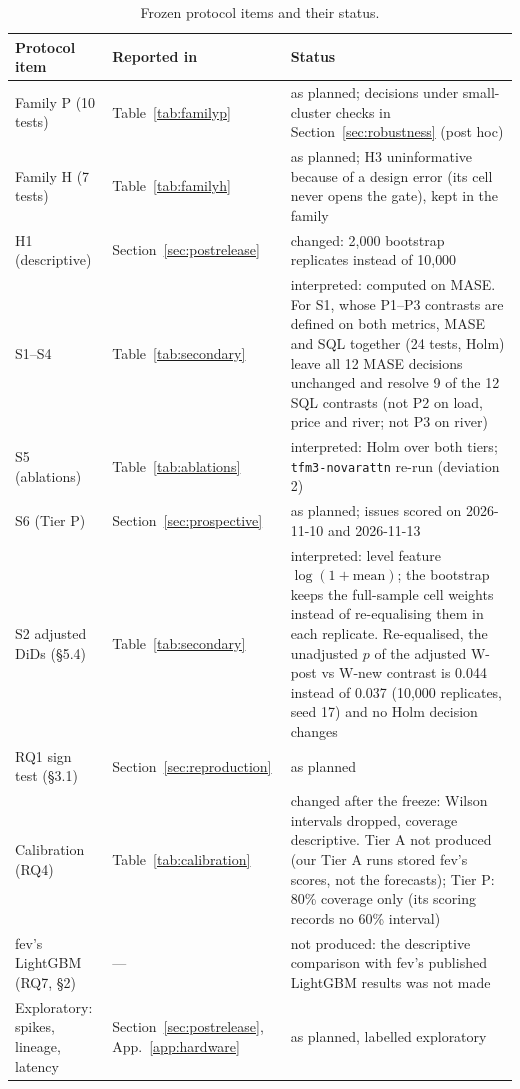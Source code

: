 \begin{table}[!htbp]
\centering
\caption{Frozen protocol items and their status.}
\label{tab:adherence}
\scriptsize
\begin{tabular}{p{4.2cm}p{2.4cm}p{8.2cm}}
\toprule
Protocol item & Reported in & Status \\
\midrule
Family P (10 tests) & Table~\ref{tab:familyp} & as planned; decisions under small-cluster checks in Section~\ref{sec:robustness} (post hoc) \\
Family H (7 tests) & Table~\ref{tab:familyh} & as planned; H3 uninformative because of a design error (its cell never opens the gate), kept in
the family \\
H1 (descriptive) & Section~\ref{sec:postrelease} & changed: 2{,}000 bootstrap replicates instead of 10{,}000 \\
S1--S4 & Table~\ref{tab:secondary} & interpreted: computed on MASE. For S1, whose P1--P3 contrasts are defined on both metrics,
MASE and SQL together (24 tests, Holm) leave all 12 MASE decisions unchanged and resolve 9 of the 12 SQL contrasts (not P2 on load,
price and river; not P3 on river) \\
S5 (ablations) & Table~\ref{tab:ablations} & interpreted: Holm over both tiers; \texttt{tfm3-novarattn} re-run (deviation 2) \\
S6 (Tier P) & Section~\ref{sec:prospective} & as planned; issues scored on 2026-11-10 and 2026-11-13 \\
S2 adjusted DiDs (\S5.4) & Table~\ref{tab:secondary} & interpreted: level feature $\log(1+\text{mean})$; the bootstrap keeps the
full-sample cell weights instead of re-equalising them in each replicate. Re-equalised, the unadjusted $p$ of the adjusted W-post vs
W-new contrast is 0.044 instead of 0.037 (10{,}000 replicates, seed 17) and no Holm decision changes \\
RQ1 sign test (\S3.1) & Section~\ref{sec:reproduction} & as planned \\
Calibration (RQ4) & Table~\ref{tab:calibration} & changed after the freeze: Wilson intervals dropped, coverage descriptive. Tier A not
produced (our Tier A runs stored fev's scores, not the forecasts); Tier P: 80\% coverage only (its scoring records no 60\% interval) \\
fev's LightGBM (RQ7, \S2) & --- & not produced: the descriptive comparison with fev's published LightGBM results was not made \\
Exploratory: spikes, lineage, latency & Section~\ref{sec:postrelease}, App.~\ref{app:hardware} & as planned, labelled exploratory \\

\end{tabular}
\end{table}
